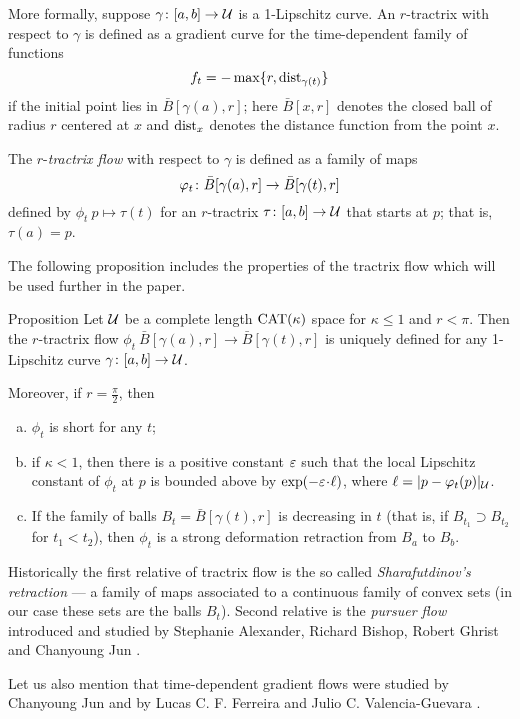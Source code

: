 \documentclass[oneside,a4paper, 12pt]{article}
\begin{document}
More formally, suppose $\gamma\colon[a,b]\to \mathcal{U}$ is a 1-Lipschitz curve. 
An $r$-tractrix with respect to $\gamma$ is defined as a gradient curve for the time-dependent family of functions 
\[f_t=- \max\{r,\mathop{\rm dist}\nolimits_{\gamma(t)}\}\]
if the initial point lies in $\bar B[\gamma(a),r]$;
here $\bar B[x,r]$ denotes the closed ball of radius $r$ centered at $x$ and $\mathop{\rm dist}\nolimits_{x}$ denotes the distance function from the point $x$.

The $r$-\emph{tractrix flow} with respect to $\gamma$ is defined as a family of maps
\[\phi_t\:\bar B[\gamma(a),r]\z\to\bar B[\gamma(t),r]\]
defined by $\phi_t\:p\mapsto \tau(t)$
for an $r$-tractrix $\tau\colon[a,b]\to \mathcal{U}$ that starts at $p$; that is, $\tau(a)=p$.

The following proposition includes the properties of the tractrix flow which will be used further in the paper.

\begin{thm}{Proposition}\label{prop-def}
Let $\mathcal{U}$ be a complete length $\mathrm{CAT}(\kappa)$ space for $\kappa\le 1$ and $r<\pi$.
Then the $r$-tractrix flow $\phi_t\:\bar B[\gamma(a),r]\to\bar B[\gamma(t),r]$ is uniquely defined for any  1-Lipschitz curve $\gamma\colon[a,b]\to \mathcal{U}$.

Moreover, if $r=\tfrac\pi2$, then
\begin{enumerate}[(a)]
 \item\label{non-strict} $\phi_t$ is short for any $t$;
 \item\label{strict} if $\kappa<1$, then there is a positive constant $\varepsilon$ such that the local Lipschitz constant of $\phi_t$ at $p$ is bounded above by $\exp(-\eps\cdot\ell)$, where $\ell=|p-\varphi_t(p)|_{\mathcal{U}}$.
 \item\label{sharafutdinov} If the family of balls $B_t=\bar B[\gamma(t),r]$ is decreasing in $t$ (that is, if $B_{t_1}\supset B_{t_2}$ for $t_1<t_2$), then $\phi_t$ is a strong deformation retraction from $B_a$ to $B_b$.
\end{enumerate}
\end{thm}

Historically the first relative of tractrix flow
is the so called \emph{Sharafutdinov's retraction} \cite{sharafutdinov} --- a family of maps associated to a continuous family of convex sets (in our case these sets are the balls $B_t$). 
Second relative is the \emph{pursuer flow} introduced and studied by Stephanie Alexander, Richard Bishop, Robert Ghrist and Chanyoung Jun \cite{ABG,jun-thesis,jun,jun:grad}.

Let us also mention that time-dependent gradient flows were studied by Chanyoung Jun \cite{jun-thesis,jun:grad} and  by Lucas C. F. Ferreira and Julio C. Valencia-Guevara \cite{ferreira-valencia}.
\end{document}

